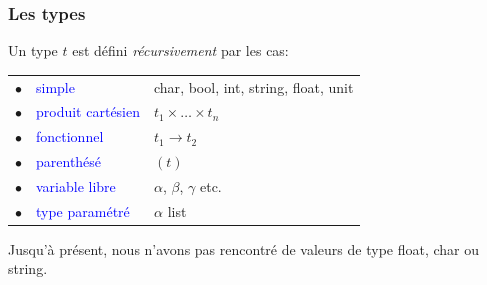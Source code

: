 
%
\begin{frame}
\frametitle{Les types}

Un type $t$ est défini \emph{récursivement} par les cas:

\begin{tabular}{rll}
    $\bullet$
  & \textcolor{blue}{simple}
  & \textsf{char}, \textsf{bool}, \textsf{int}, \textsf{string},
    \textsf{float}, \textsf{unit}\\
    $\bullet$
  & \textcolor{blue}{produit cartésien}
  & $t_1 \times \ldots \times t_n$\\
    $\bullet$
  & \textcolor{blue}{fonctionnel}
  & $t_1 \rightarrow t_2$\\
    $\bullet$
  & \textcolor{blue}{parenthésé}
  & $(t)$\\
    $\bullet$
  & \textcolor{blue}{variable libre}
  & $\alpha$, $\beta$, $\gamma$ etc. \\
    $\bullet$
  & \textcolor{blue}{type paramétré}
  & $\alpha$ \textsf{list}
\end{tabular}

\bigskip

\remarque

Jusqu'à présent, nous n'avons pas rencontré de valeurs de type
\textsf{float}, \textsf{char} ou \textsf{string}.

\end{frame}


